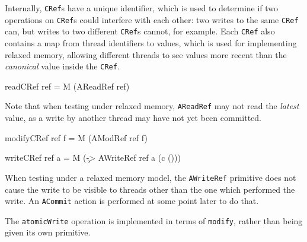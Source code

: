 
Internally, \verb|CRef|s have a unique identifier, which is used to
determine if two operations on \verb|CRef|s could interfere with each
other: two writes to the same \verb|CRef| can, but writes to two
different \verb|CRef|s cannot, for example. Each \verb|CRef| also
contains a map from thread identifiers to values, which is used for
implementing relaxed memory, allowing different threads to see values
more recent than the \emph{canonical} value inside the \verb|CRef|.

\begin{haskellcode}
readCRef ref = M (AReadRef ref)
\end{haskellcode}


Note that when testing under relaxed memory, \verb|AReadRef| may not
read the \emph{latest} value, as a write by another thread may have
not yet been committed.

\begin{haskellcode}
modifyCRef ref f = M (AModRef ref f)
\end{haskellcode}


\begin{haskellcode}
writeCRef ref a = M (\c -> AWriteRef ref a (c ()))
\end{haskellcode}


When testing under a relaxed memory model, the \verb|AWriteRef|
primitive does not cause the write to be visible to threads other than
the one which performed the write. An \verb|ACommit| action is
performed at some point later to do that.


The \verb|atomicWrite| operation is implemented in terms of
\verb|modify|, rather than being given its own primitive.

